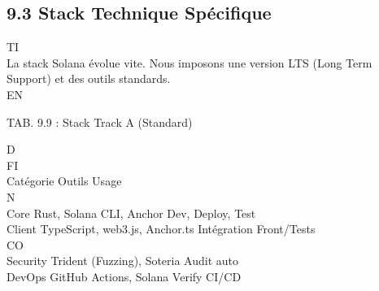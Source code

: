 \subsection{9.3 Stack Technique Spécifique}
\vspace{0.5em}
\vspace{0.5em}
\vspace{0.5em}
\vspace{0.5em}
TI\\
La stack Solana évolue vite. Nous imposons une version LTS (Long Term Support) et des outils standards.\\
\vspace{0.5em}
\vspace{0.5em}
\vspace{0.5em}
\vspace{0.5em}
EN\\
\begin{center}\begin{tabular}TAB. 9.9 : Stack Track A (Standard)\end{tabular}\end{center}
\vspace{0.5em}
\vspace{0.5em}
\vspace{0.5em}
\vspace{0.5em}
D\\
FI\\
Catégorie Outils                         Usage\\
\vspace{0.5em}
\vspace{0.5em}
N\\
Core      Rust, Solana CLI, Anchor       Dev, Deploy, Test\\
Client    TypeScript, web3.js, Anchor.ts Intégration Front/Tests\\
CO\\
Security  Trident (Fuzzing), Soteria     Audit auto\\
DevOps    GitHub Actions, Solana Verify CI/CD\\
\vspace{0.5em}
\vspace{0.5em}
\vspace{0.5em}
\vspace{0.5em}
